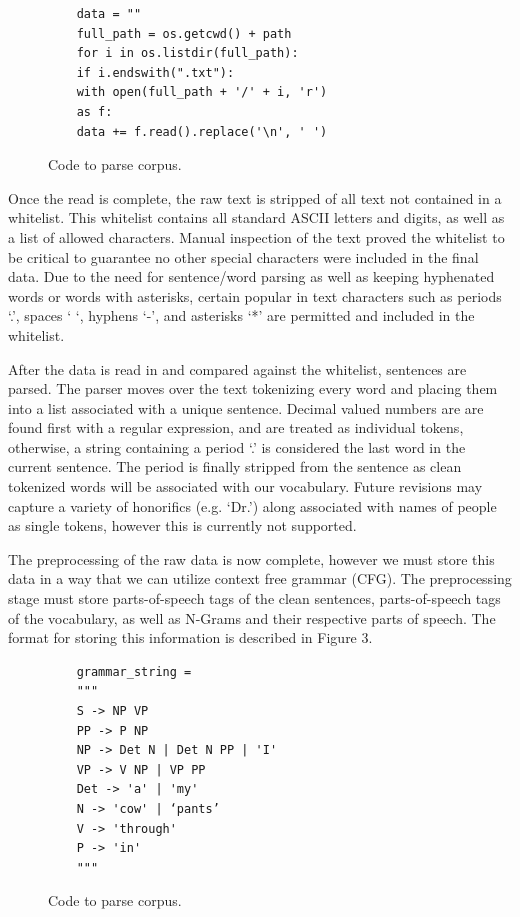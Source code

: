 \documentclass[letterpaper, 10 pt, conference]{ieeeconf}  %
\begin{document}
\begin{figure}[!ht]
	\begin{verbatim}
	data = ""
	full_path = os.getcwd() + path
	for i in os.listdir(full_path):
	if i.endswith(".txt"):
	with open(full_path + '/' + i, 'r')
	as f:
	data += f.read().replace('\n', ' ')
	\end{verbatim}

	\caption{Code to parse corpus.}
	\label{fig:Codeparse}
\end{figure}

Once the read is complete, the raw text is stripped of all text not contained in a whitelist. This whitelist contains all standard ASCII letters and digits, as well as a list of allowed characters. Manual inspection of the text proved the whitelist to be critical to guarantee no other special characters were included in the final data. Due to the need for sentence/word parsing as well as keeping hyphenated words or words with asterisks, certain popular in text characters such as periods ‘.’, spaces ‘ ‘, hyphens ‘-’, and asterisks ‘*’ are permitted and included in the whitelist.

After the data is read in and compared against the whitelist, sentences are parsed. The parser moves over the text tokenizing every word and placing them into a list associated with a unique sentence. Decimal valued numbers are are found first with a regular expression, and are treated as individual tokens, otherwise, a string containing a period ‘.’ is considered the last word in the current sentence. The period is finally stripped from the sentence as clean tokenized words will be associated with our vocabulary. Future revisions may capture a variety of honorifics (e.g. ‘Dr.’) along associated with names of people as single tokens, however this is currently not supported.

The preprocessing of the raw data is now complete, however we must store this data in a way that we can utilize context free grammar (CFG). The preprocessing stage must store parts-of-speech tags of the clean sentences, parts-of-speech tags of the vocabulary, as well as N-Grams and their respective parts of speech. The format for storing this information is described in Figure 3.

\begin{figure}[!ht]
	\begin{verbatim}
	grammar_string =
	"""
	S -> NP VP
	PP -> P NP
	NP -> Det N | Det N PP | 'I'
	VP -> V NP | VP PP
	Det -> 'a' | 'my'
	N -> 'cow' | ‘pants’
	V -> 'through'
	P -> 'in'
	"""
	\end{verbatim}
	\caption{Code to parse corpus.}
	\label{fig:gramstring}
\end{figure}
\end{document}
